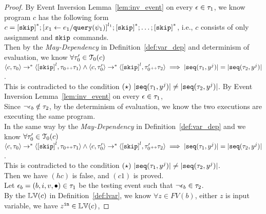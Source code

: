 \begin{proof}
By Event Inversion Lemma~\ref{lem:inv_event} on every $\mathtt{\epsilon} \in \mathtt{\tau}_1$, we know program $c$ has the following form
\\
$c =  \clabel{\eskip}^*;\clabel{\assign{x_1}{\expr_1 / \query(\qexpr_1)}}^{l_1}; \clabel{\eskip}^*; \ldots; \clabel{\eskip}^* $, i.e., $c$ consists of 
only assignment and $\mathtt{skip}$ commands.
\\
Then by the \emph{May-Dependency} in Definition~\ref{def:var_dep} and 
determinism of evaluation,
we know $\forall \mathtt{\tau}_0' \in \mathcal{T}_0(c)$
\\
$
\config{{c}, \vtrace_0} \rightarrow^{*} 
  \config{\clabel{\eskip}^l, \vtrace_0  \tracecat \trace_1 } 
  \land 
  \config{{c}, \vtrace_0'} \rightarrow^{*} 
\config{\clabel{\eskip}^l, \vtrace_0'  \tracecat \trace_2} 
\implies
|\seq(\trace_1, y^j)| = |\seq(\trace_2, y^j)|$.
\\
This is contradicted to the condition $(\star)~|\seq(\trace_1, y^j)| \neq |\seq(\trace_2, y^j)|$.
By Event Inversion Lemma~\ref{lem:inv_event} on every $\mathtt{\epsilon} \in \mathtt{\tau}_1$, 
\\
Since $\neg \mathtt{\epsilon}_b \notin \mathtt{\tau}_2$, 
by the
determinism of evaluation, we know the two executions are executing the same program.
\\
In the same way by the \emph{May-Dependency} in Definition~\ref{def:var_dep} and 
we know 
$\forall \mathtt{\tau}_0' \in \mathcal{T}_0(c)$
\\
$
\config{{c}, \vtrace_0} \rightarrow^{*} 
  \config{\clabel{\eskip}^l, \vtrace_0  \tracecat \trace_1 } 
  \land 
  \config{{c}, \vtrace_0'} \rightarrow^{*} 
\config{\clabel{\eskip}^l, \vtrace_0'  \tracecat \trace_2} 
\implies
|\seq(\trace_1, y^j)| = |\seq(\trace_2, y^j)|$.
\\
This is contradicted to the condition $(\star)~|\seq(\trace_1, y^j)| \neq |\seq(\trace_2, y^j)|$.
\\
Then we have $(hc)$ is false, and $(c1)$ is proved.
\\
Let $\mathtt{\epsilon}_b = (b, i, v, \bullet) \in \mathtt{\tau}_1$ be the testing event such that 
$\neg \mathtt{\epsilon}_b \in \mathtt{\tau}_2$.
\\
By the $\mathbb{LV}(c)$ in Definition~\ref{def:lvar}, we know 
$\forall z \in FV(b)$, either $z$ is input variable, we have $z^{\mathtt{in}} \in \mathbb{LV}(c)$,

\end{proof}
